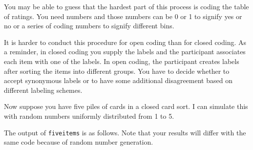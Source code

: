 You may be able to guess that the hardest part of this process is coding
the table of ratings. You need numbers and those numbers can be 0 or 1
to signify yes or no or a series of coding numbers to signify different
bins.

It is harder to conduct this procedure for open coding than for closed
coding. As a reminder, in closed coding you supply the labels and the
participant associates each item with one of the labels. In open coding,
the participant creates labels after sorting the items into different
groups. You have to decide whether to accept synonymous labels or to
have some additional disagreement based on different labeling schemes.

Now suppose you have five piles of cards in a closed card sort. I can
simulate this with random numbers uniformly distributed from 1 to 5.

\begin{Shaded}
\begin{Highlighting}[]
\OtherTok{\textless{}{-}} 
\OtherTok{\textless{}{-}} \NormalTok{(}\NormalTok{(} \NormalTok{, } \NormalTok{))}
\OtherTok{\textless{}{-}} \NormalTok{(}\NormalTok{(} \NormalTok{, } \NormalTok{))}
\OtherTok{\textless{}{-}} \NormalTok{(}\NormalTok{(} \NormalTok{, } \NormalTok{))}
\OtherTok{\textless{}{-}} \NormalTok{(}\NormalTok{(} \NormalTok{, } \NormalTok{))}
\OtherTok{\textless{}{-}} 
\end{Highlighting}
\end{Shaded}

The output of \texttt{fiveitems} is as follows. Note that your results
will differ with the same code because of random number generation.

